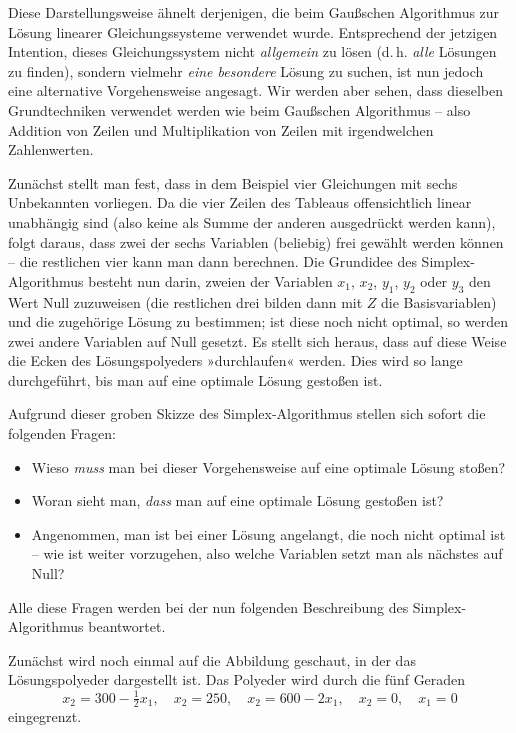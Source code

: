 Diese Darstellungsweise ähnelt derjenigen, die beim Gaußschen Algorithmus zur Lösung linearer Gleichungssysteme verwendet wurde. Entsprechend der jetzigen Intention, dieses Gleichungssystem nicht \emph{allgemein} zu lösen (d.\,h. \emph{alle} Lösungen zu finden), sondern vielmehr \emph{eine besondere} Lösung zu suchen, ist nun jedoch eine alternative Vorgehensweise angesagt. Wir werden aber sehen, dass dieselben Grundtechniken verwendet werden wie beim Gaußschen Algorithmus -- also Addition von Zeilen und Multiplikation von Zeilen mit irgendwelchen Zahlenwerten.

Zunächst stellt man fest, dass in dem Beispiel vier Gleichungen mit sechs Unbekannten vorliegen. Da die vier Zeilen des Tableaus offensichtlich linear unabhängig sind (also keine als Summe der anderen ausgedrückt werden kann), folgt daraus, dass zwei der sechs Variablen (beliebig) frei gewählt werden können -- die restlichen vier kann man dann berechnen. Die Grundidee des Simplex-Algorithmus besteht nun darin, zweien der Variablen $x_1$, $x_2$, $y_1$, $y_2$ oder $y_3$ den Wert Null zuzuweisen (die restlichen drei bilden dann mit $Z$ die Basisvariablen) und die zugehörige Lösung zu bestimmen; ist diese noch nicht optimal, so werden zwei andere Variablen auf Null gesetzt. Es stellt sich heraus, dass auf diese Weise die Ecken des Lösungspolyeders »durchlaufen« werden. Dies wird so lange durchgeführt, bis man auf eine optimale Lösung gestoßen ist.

Aufgrund dieser groben Skizze des Simplex-Algorithmus stellen sich sofort die folgenden Fragen:
\begin{itemize}
  \item Wieso \emph{muss} man bei dieser Vorgehensweise auf eine optimale Lösung stoßen?
  \item Woran sieht man, \emph{dass} man auf eine optimale Lösung gestoßen ist?
  \item Angenommen, man ist bei einer Lösung angelangt, die noch nicht optimal ist -- wie ist weiter vorzugehen, also welche Variablen setzt man als nächstes auf Null?
\end{itemize}
Alle diese Fragen werden bei der nun folgenden Beschreibung des Simplex-Algorithmus beantwortet.

Zunächst wird noch einmal auf die Abbildung geschaut, in der das Lösungspolyeder dargestellt ist. Das Polyeder wird durch die fünf Geraden
\[ x_2 = 300 - \tfrac{1}{2}x_1, \quad x_2 = 250, \quad x_2 = 600 - 2x_1, \quad x_2 = 0, \quad x_1 = 0 \]
eingegrenzt.

